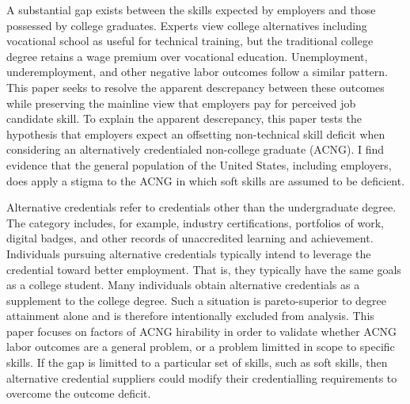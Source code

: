 \documentclass[review]{elsarticle}
\begin{document}

A substantial gap exists between the skills expected by employers and those possessed by college graduates\cite{mcgarry2016examination, malik2017great, abbasi2018analysis, gingras2000there}.
Experts view college alternatives including vocational school as useful for technical training, but the traditional college degree retains a wage premium over vocational education.
Unemployment, underemployment, and other negative labor outcomes follow a similar pattern\cite{smith_2011}.
This paper seeks to resolve the apparent descrepancy between these outcomes while preserving the mainline view that employers pay for perceived job candidate skill.
To explain the apparent descrepancy,
this paper tests the hypothesis that employers expect an offsetting non-technical skill deficit when considering an alternatively credentialed non-college graduate (ACNG).
I find evidence that the general population of the United States, including employers, does apply a stigma to the ACNG in which soft skills are assumed to be deficient.

Alternative credentials refer to credentials other than the undergraduate degree\cite{brown2017complex}.
The category includes, for example,
industry certifications,
portfolios of work,
digital badges, and other records of unaccredited learning and achievement.
Individuals pursuing alternative credentials typically intend to leverage the credential toward better employment.
That is, they typically have the same goals as a college student.
Many individuals obtain alternative credentials as a supplement to the college degree.
Such a situation is pareto-superior to degree attainment alone and is therefore intentionally excluded from analysis.
This paper focuses on factors of ACNG hirability in order to validate whether ACNG labor outcomes are a general problem,
or a problem limitted in scope to specific skills.
If the gap is limitted to a particular set of skills, such as soft skills, then alternative credential suppliers could modify their credentialling requirements to overcome the outcome deficit.

\end{document}

